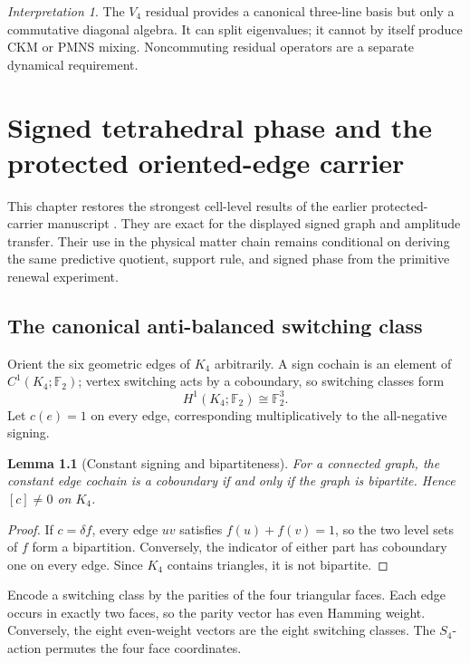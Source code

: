 \documentclass[11pt,oneside,openany]{book}
\numberwithin{equation}{chapter}
\newtheorem{lemma}[theorem]{Lemma}
\theoremstyle{definition}
\theoremstyle{remark}
\newtheorem{interpretation}[theorem]{Interpretation}
\newcommand{\Ftwo}{\mathbb F_2}
\begin{document}
\begin{interpretation}
The $V_4$ residual provides a canonical three-line basis but only a commutative diagonal algebra.  It can split eigenvalues; it cannot by itself produce CKM or PMNS mixing.  Noncommuting residual operators are a separate dynamical requirement.
\end{interpretation}


\chapter{Signed tetrahedral phase and the protected oriented-edge carrier}
\label{ch:signed-k4-carrier}

This chapter restores the strongest cell-level results of the earlier
protected-carrier manuscript \cite{PelissierProtectedK4}.  They are exact for
the displayed signed graph and amplitude transfer.  Their use in the physical
matter chain remains conditional on deriving the same predictive quotient,
support rule, and signed phase from the primitive renewal experiment.

\section{The canonical anti-balanced switching class}

Orient the six geometric edges of \(K_4\) arbitrarily.  A sign cochain is an
element of \(C^1(K_4;\Ftwo)\); vertex switching acts by a coboundary, so
switching classes form
\[
 H^1(K_4;\Ftwo)\cong\Ftwo^3.
\]
Let \(c(e)=1\) on every edge, corresponding multiplicatively to the
all-negative signing.

\begin{lemma}[Constant signing and bipartiteness]
\label{lem:constant-sign-bipartite}
For a connected graph, the constant edge cochain is a coboundary if and only
if the graph is bipartite.  Hence \([c]\neq0\) on \(K_4\).
\end{lemma}

\begin{proof}
If \(c=\delta f\), every edge \(uv\) satisfies \(f(u)+f(v)=1\), so the two
level sets of \(f\) form a bipartition.  Conversely, the indicator of either
part has coboundary one on every edge.  Since \(K_4\) contains triangles, it
is not bipartite.
\end{proof}

Encode a switching class by the parities of the four triangular faces.  Each
edge occurs in exactly two faces, so the parity vector has even Hamming
weight.  Conversely, the eight even-weight vectors are the eight switching
classes.  The \(S_4\)-action permutes the four face coordinates.
\end{document}
